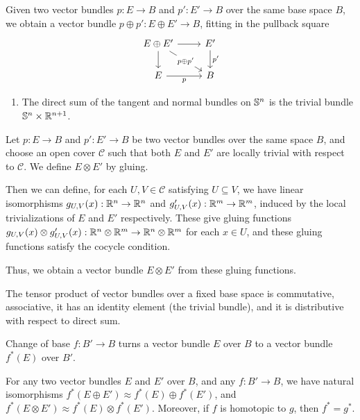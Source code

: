\documentclass{article}
\begin{document}
\begin{defn}
Given two vector bundles $p:E\to B$ and $p':E'\to B$ over the same base space
$B$, we obtain a vector bundle $p\oplus p': E\oplus E'\to B$, fitting in the
pullback square
\begin{equation*}
\begin{tikzcd}
E\oplus E' \arrow[r] \arrow[d] \arrow[dr,"{p\oplus p'}" description ] & E' \arrow[d,"{p'}"] \\
E \arrow[r,swap,"p"] & B
\end{tikzcd}
\end{equation*}
\end{defn}

\begin{eg}
\begin{enumerate}
\item The direct sum of the tangent and normal bundles on $\mathbb{S}^n$ is the trivial
bundle $\mathbb{S}^n\times\mathbb{R}^{n+1}$. 
\end{enumerate}
\end{eg}

\begin{defn}
Let $p:E\to B$ and $p':E'\to B$ be two vector bundles over the same space $B$,
and choose an open cover $\mathcal{C}$ such that both $E$ and $E'$ are locally
trivial with respect to $\mathcal{C}$. We define $E\otimes E'$ by gluing. 

Then we can define, for each $U,V\in\mathcal{C}$ satisfying $U\subseteq V$, we
have linear isomorphisms $g_{U,V}(x):\mathbb{R}^n\to\mathbb{R}^n$ and $g'_{U,V}(x):\mathbb{R}^m\to\mathbb{R}^m$,
induced by the local trivializations of $E$ and $E'$ respectively. These give
gluing functions $g_{U,V}(x)\otimes g'_{U,V}(x):\mathbb{R}^n\otimes\mathbb{R}^m\to\mathbb{R}^n\otimes\mathbb{R}^m$
for each $x\in U$, and these gluing functions satisfy the cocycle condition.

Thus, we obtain a vector bundle $E\otimes E'$ from these gluing functions.
\end{defn}

\begin{lem}
The tensor product of vector bundles over a fixed base space is commutative,
associative, it has an identity element (the trivial bundle), and it is
distributive with respect to direct sum.
\end{lem}

Change of base $f:B'\to B$ turns a vector bundle $E$ over $B$ to a vector
bundle $f^\ast(E)$ over $B'$.

\begin{lem}
For any two vector bundles $E$ and $E'$ over $B$, and any $f:B'\to B$, we have
natural isomorphisms $f^\ast(E\oplus E')\approx f^\ast(E)\oplus f^\ast(E')$, and
$f^\ast(E\otimes E')\approx f^\ast(E)\otimes f^\ast(E')$. Moreover, if $f$
is homotopic to $g$, then $f^\ast=g^\ast$. 
\end{lem}
\end{document}
